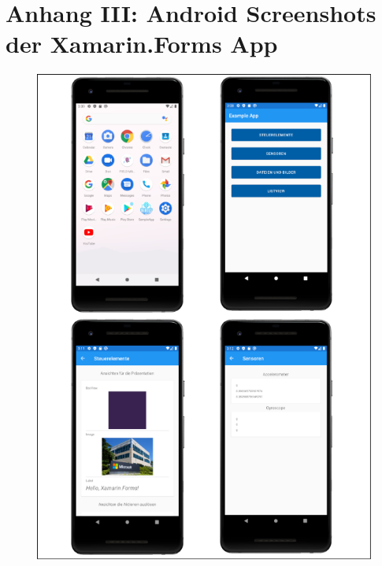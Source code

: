 \chapter{Anhang III: Android Screenshots der Xamarin.Forms App}
\label{chap:AnhangAndroidScreenshots}


\begin{figure}[ht!]
 \includegraphics[width=\textwidth,keepaspectratio]{Images/Screenshot/AndroidScrenshotI.png}
\end{figure}

